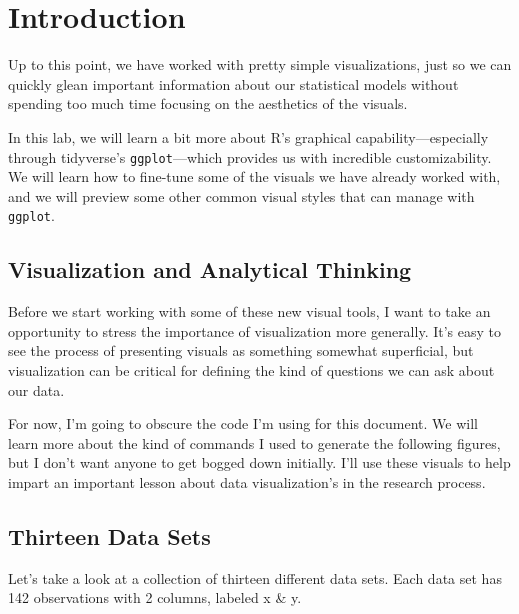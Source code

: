 \documentclass[
  letterpaper,
  DIV=11,
  numbers=noendperiod]{scrreprt}
\begin{document}
\chapter*{Introduction}\label{introduction}


Up to this point, we have worked with pretty simple visualizations, just
so we can quickly glean important information about our statistical
models without spending too much time focusing on the aesthetics of the
visuals.

In this lab, we will learn a bit more about R's graphical
capability---especially through tidyverse's \texttt{ggplot}---which
provides us with incredible customizability. We will learn how to
fine-tune some of the visuals we have already worked with, and we will
preview some other common visual styles that can manage with
\texttt{ggplot}.

\section*{Visualization and Analytical
Thinking}\label{visualization-and-analytical-thinking}


Before we start working with some of these new visual tools, I want to
take an opportunity to stress the importance of visualization more
generally. It's easy to see the process of presenting visuals as
something somewhat superficial, but visualization can be critical for
defining the kind of questions we can ask about our data.

For now, I'm going to obscure the code I'm using for this document. We
will learn more about the kind of commands I used to generate the
following figures, but I don't want anyone to get bogged down initially.
I'll use these visuals to help impart an important lesson about data
visualization's in the research process.

\section*{Thirteen Data Sets}\label{thirteen-data-sets}


Let's take a look at a collection of thirteen different data sets. Each
data set has 142 observations with 2 columns, labeled x \& y.
\end{document}
